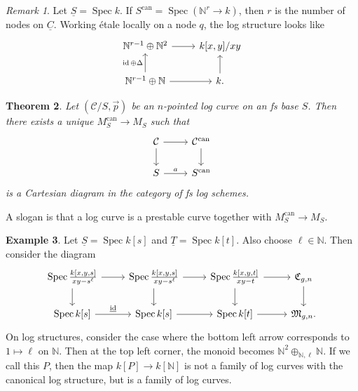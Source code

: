 \documentclass{amsart}
\newtheorem{thm}{Theorem}[section]
\theoremstyle{definition}
\newtheorem{exm}[thm]{Example}
\theoremstyle{remark}
\newtheorem{rmk}[thm]{Remark}
\theoremstyle{plain}
\theoremstyle{definition}
\theoremstyle{remark}
\newcommand{\N}{\mathbb{N}}
\newcommand{\mc}[1]{\mathcal{#1}}
\newcommand{\mf}[1]{\mathfrak{#1}}
\newcommand{\on}[1]{\operatorname{#1}}
\newcommand{\ul}[1]{\underline{#1}}
\newcommand{\1}{\mathbf{1}}
\newcommand{\2}{\mathbf{2}}
\newcommand{\3}{\mathbf{3}}
\DeclareMathOperator{\Spec}{Spec}
\begin{document}
\begin{rmk}
    Let \(\ul{S} = \Spec k\). If \(S^{\on{can}} = \Spec (\N^r \to k)\), then \(r\) is the number of nodes on \(\ul{C}\). Working \'etale locally on a node \(q\), the log structure looks like
    \begin{equation*}
    \begin{tikzcd}
        \N^{r-1} \oplus \N^2 \ar{r} & k[x,y]/xy \\
        \N^{r-1} \oplus \N \ar{u}{\on{id}\oplus\Delta} \ar{r} & k \ar{u}.
    \end{tikzcd}
    \end{equation*}
\end{rmk}

\begin{thm}
    Let \((\mc{C}/S, \vec{p})\) be an \(n\)-pointed log curve on an fs base \(S\). Then there exists a unique \(M_S^{\on{can}} \to M_S\) such that
    \begin{equation*}
    \begin{tikzcd}
        \mc{C} \ar{d} \ar{r} & \mc{C}^{\on{can}} \ar{d} \\
        S \ar{r}{a} & S^{\on{can}}
    \end{tikzcd}
    \end{equation*}
    is a Cartesian diagram in the category of fs log schemes.
\end{thm}

A slogan is that a log curve is a prestable curve together with \(M_S^{\on{can}} \to M_S\).

\begin{exm}
    Let \(\ul{S} = \Spec k[s]\) and \(\ul{T} = \Spec k[t]\). Also choose \(\ell \in \N\). Then consider the diagram
    \begin{equation*}
    \begin{tikzcd}
        \Spec \frac{k{ [x,y,s] }}{xy-s^{\ell}} \ar{d} \ar{r} & \Spec \frac{k{ [x,y,s] }}{xy-s^{\ell}} \ar{d} \ar{r} & \Spec  \frac{k{[x,y,t]}}{xy-t} \ar{r}\ar{d} & \mf{C}_{g,n} \ar{d} \\
        \Spec k{[s]} \ar{r}{\ul{ \on{id} }} & \Spec {k[s]} \ar{r} & \Spec k{[t]} \ar{r} & \mf{M}_{g,n}.
    \end{tikzcd}
    \end{equation*}
    On log structures, consider the case where the bottom left arrow corresponds to \(1 \mapsto \ell\) on \(\N\). Then at the top left corner, the monoid becomes \(\N^2 \oplus_{\N, \ell} \N\). If we call this \(P\), then the map \(k[P] \to k[\N]\) is not a family of log curves with the canonical log structure, but is a family of log curves.
\end{exm}
\end{document}
